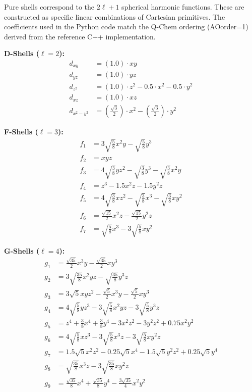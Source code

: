 \documentclass{article}
\begin{document}
Pure shells correspond to the $2\ell + 1$ spherical harmonic functions. These are constructed as specific linear combinations of Cartesian primitives. The coefficients used in the Python code match the Q-Chem ordering (AOorder=1) derived from the reference C++ implementation.

\textbf{D-Shells ($\ell=2$):}
\begin{align*}
    d_{xy} &= (1.0) \cdot xy \\
    d_{yz} &= (1.0) \cdot yz \\
    d_{z^2} &= (1.0) \cdot z^2 - 0.5 \cdot x^2 - 0.5 \cdot y^2 \\
    d_{xz} &= (1.0) \cdot xz \\
    d_{x^2-y^2} &= (\frac{\sqrt{3}}{2}) \cdot x^2 - (\frac{\sqrt{3}}{2}) \cdot y^2
\end{align*}

\textbf{F-Shells ($\ell=3$):}
\begin{align*}
    f_{1} &= 3\sqrt{\frac{5}{8}} x^2 y - \sqrt{\frac{5}{8}} y^3 \\
    f_{2} &= xyz \\
    f_{3} &= 4\sqrt{\frac{3}{8}} yz^2 - \sqrt{\frac{3}{8}} y^3 - \sqrt{\frac{3}{8}} x^2 y \\
    f_{4} &= z^3 - 1.5 x^2 z - 1.5 y^2 z \\
    f_{5} &= 4\sqrt{\frac{3}{8}} xz^2 - \sqrt{\frac{3}{8}} x^3 - \sqrt{\frac{3}{8}} xy^2 \\
    f_{6} &= \frac{\sqrt{15}}{2} x^2 z - \frac{\sqrt{15}}{2} y^2 z \\
    f_{7} &= \sqrt{\frac{5}{8}} x^3 - 3\sqrt{\frac{5}{8}} xy^2
\end{align*}

\textbf{G-Shells ($\ell=4$):}
\begin{align*}
    g_{1} &= \frac{\sqrt{35}}{2} x^3 y - \frac{\sqrt{35}}{2} xy^3 \\
    g_{2} &=  3\sqrt{\frac{35}{8}} x^2 yz - \sqrt{\frac{35}{8}} y^3 z \\
    g_{3} &= 3\sqrt{5} xyz^2 - \frac{\sqrt{5}}{2} x^3 y - \frac{\sqrt{5}}{2} xy^3 \\
    g_{4} &= 4\sqrt{\frac{5}{8}} yz^3 - 3\sqrt{\frac{5}{8}} x^2 yz - 3\sqrt{\frac{5}{8}} y^3 z \\
    g_{5} &= z^4 + \frac{3}{8} x^4 + \frac{3}{8} y^4 - 3 x^2 z^2 - 3 y^2 z^2 + 0.75 x^2 y^2 \\
    g_{6} &= 4\sqrt{\frac{5}{8}} xz^3 - 3\sqrt{\frac{5}{8}} x^3 z - 3\sqrt{\frac{5}{8}} xy^2 z \\
    g_{7} &= 1.5\sqrt{5} x^2 z^2 - 0.25\sqrt{5} x^4 - 1.5\sqrt{5} y^2 z^2 + 0.25\sqrt{5} y^4 \\
    g_{8} &= \sqrt{\frac{35}{8}} x^3 z - 3\sqrt{\frac{35}{8}} xy^2 z \\
    g_{9} &= \frac{\sqrt{35}}{8} x^4 + \frac{\sqrt{35}}{8} y^4 - \frac{3\sqrt{35}}{4} x^2 y^2
\end{align*}
\end{document}
